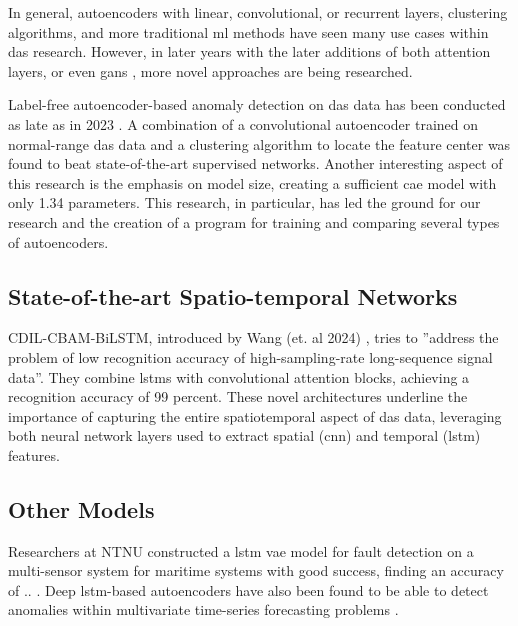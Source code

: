In general, autoencoders with linear, convolutional, or recurrent layers, clustering algorithms, and more traditional \acrshort{ml} methods have seen many use cases within \acrshort{das} research. However, in later years with the later additions of both attention layers, or even \acrshort{gan}s \cite{goodfellow2014generative, goodfellow2016nips}, more novel approaches are being researched.  

\cite{wang2024deep} 



Label-free autoencoder-based anomaly detection on \acrshort{das} data has been conducted as late as in 2023 \cite{xie2023label}. A combination of a convolutional autoencoder trained on normal-range \acrshort{das} data and a clustering algorithm to locate the feature center was found to beat state-of-the-art supervised networks. Another interesting aspect of this research is the emphasis on model size, creating a sufficient \acrshort{cae} model with only \qty{1.34}{\si{\kilo}} parameters. This research, in particular, has led the ground for our research and the creation of a program for training and comparing several types of autoencoders. \\


\subsection{State-of-the-art Spatio-temporal Networks}

CDIL-CBAM-BiLSTM, introduced by Wang (et. al 2024) \cite{wang2024deep}, tries to ''address the problem of low recognition accuracy of high-sampling-rate long-sequence signal data''. They combine \acrshort{lstm}s with convolutional attention blocks, achieving a recognition accuracy of 99 percent. These novel architectures underline the importance of capturing the entire spatiotemporal aspect of \acrshort{das} data, leveraging both neural network layers used to extract spatial (\acrshort{cnn}) and temporal (\acrshort{lstm}) features.



\subsection{Other Models}

Researchers at NTNU constructed a \acrshort{lstm} \acrshort{vae} model for fault detection on a multi-sensor system for maritime systems \cite{9514856} with good success, finding an accuracy of .. . Deep \acrshort{lstm}-based autoencoders have also been found to be able to detect anomalies within multivariate time-series forecasting problems \cite{alaaDeepLstm2019}.


